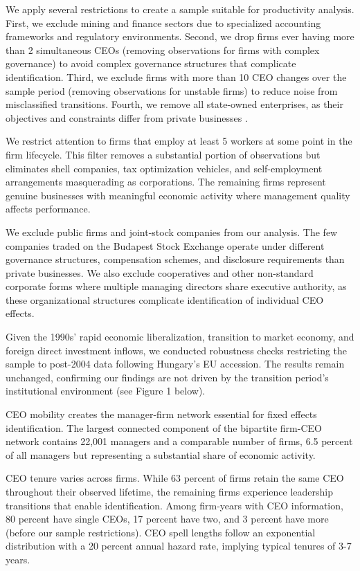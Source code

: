 \documentclass[11pt,a4paper]{article}
\begin{document}
We apply several restrictions to create a sample suitable for productivity analysis. First, we exclude mining and finance sectors due to specialized accounting frameworks and regulatory environments. Second, we drop firms ever having more than 2 simultaneous CEOs (removing observations for firms with complex governance) to avoid complex governance structures that complicate identification. Third, we exclude firms with more than 10 CEO changes over the sample period (removing observations for unstable firms) to reduce noise from misclassified transitions. Fourth, we remove all state-owned enterprises, as their objectives and constraints differ from private businesses \citep{orban2019inception}.

We restrict attention to firms that employ at least 5 workers at some point in the firm lifecycle. This filter removes a substantial portion of observations but eliminates shell companies, tax optimization vehicles, and self-employment arrangements masquerading as corporations. The remaining firms represent genuine businesses with meaningful economic activity where management quality affects performance.

We exclude public firms and joint-stock companies from our analysis. The few companies traded on the Budapest Stock Exchange operate under different governance structures, compensation schemes, and disclosure requirements than private businesses. We also exclude cooperatives and other non-standard corporate forms where multiple managing directors share executive authority, as these organizational structures complicate identification of individual CEO effects.



Given the 1990s' rapid economic liberalization, transition to market economy, and foreign direct investment inflows, we conducted robustness checks restricting the sample to post-2004 data following Hungary's EU accession. The results remain unchanged, confirming our findings are not driven by the transition period's institutional environment (see Figure 1 below).

CEO mobility creates the manager-firm network essential for fixed effects identification. The largest connected component of the bipartite firm-CEO network contains 22,001 managers and a comparable number of firms, 6.5 percent of all managers but representing a substantial share of economic activity.

CEO tenure varies across firms. While 63 percent of firms retain the same CEO throughout their observed lifetime, the remaining firms experience leadership transitions that enable identification. Among firm-years with CEO information, 80 percent have single CEOs, 17 percent have two, and 3 percent have more (before our sample restrictions). CEO spell lengths follow an exponential distribution with a 20 percent annual hazard rate, implying typical tenures of 3-7 years.
\end{document}
